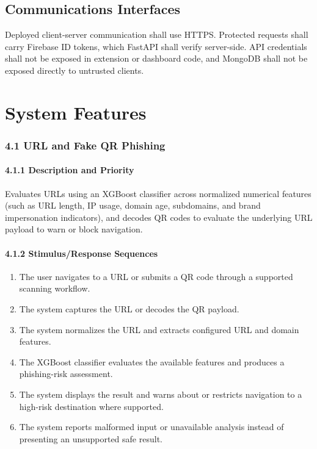 \documentclass[12pt,a4paper]{report}
\let\originaladdcontentsline\addcontentsline
\renewcommand{\addcontentsline}[3]{\phantomsection\originaladdcontentsline{#1}{#2}{#3}}
\begin{document}
\section{Communications Interfaces}

Deployed client-server communication shall use HTTPS. Protected requests shall carry Firebase ID tokens, which FastAPI shall verify server-side. API credentials shall not be exposed in extension or dashboard code, and MongoDB shall not be exposed directly to untrusted clients.\par

\chapter{System Features}

\subsection*{4.1 URL and Fake QR Phishing}

\subsubsection*{4.1.1 Description and Priority}

Evaluates URLs using an XGBoost classifier across normalized numerical features (such as URL length, IP usage, domain age, subdomains, and brand impersonation indicators), and decodes QR codes to evaluate the underlying URL payload to warn or block navigation.\par

\subsubsection*{4.1.2 Stimulus/Response Sequences}

\begin{enumerate}
\item The user navigates to a URL or submits a QR code through a supported scanning workflow.
\item The system captures the URL or decodes the QR payload.
\item The system normalizes the URL and extracts configured URL and domain features.
\item The XGBoost classifier evaluates the available features and produces a phishing-risk assessment.
\item The system displays the result and warns about or restricts navigation to a high-risk destination where supported.
\item The system reports malformed input or unavailable analysis instead of presenting an unsupported safe result.
\end{enumerate}
\end{document}

